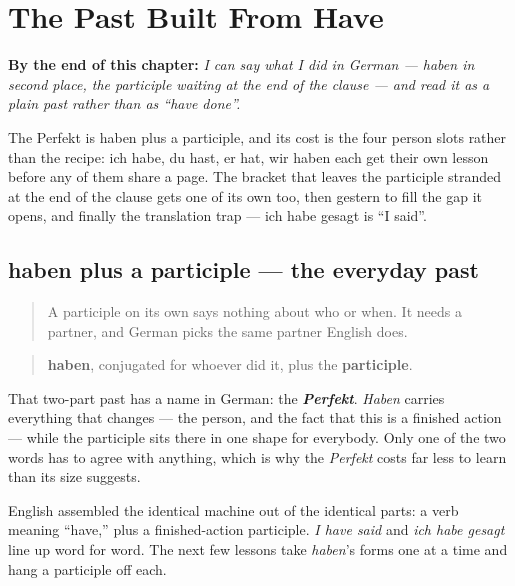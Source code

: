 
\chapter{The Past Built From Have}
\label{ch:perfekt}

\begin{chapteropening}
\textbf{By the end of this chapter:} \emph{I can say what I did in German — haben in second place, the participle waiting at the end of the clause — and read it as a plain past rather than as “have done”.}

The Perfekt is haben plus a participle, and its cost is the four person slots rather than the recipe: ich habe, du hast, er hat, wir haben each get their own lesson before any of them share a page. The bracket that leaves the participle stranded at the end of the clause gets one of its own too, then gestern to fill the gap it opens, and finally the translation trap — ich habe gesagt is “I said”.
\end{chapteropening}

\section[haben plus Partizip]{haben plus a participle — the everyday past}

\label{lesson:GE-C15-perfekt}



\begin{quote}
A participle on its own says nothing about who or when. It needs a partner, and German picks the same partner English does.
\end{quote}

\begin{grammarlens}[title={Grammar Lens: the recipe}]
\begin{quote}
\textbf{haben}, conjugated for whoever did it, plus the \textbf{participle}.
\end{quote}

That two-part past has a name in German: the \emph{\textbf{Perfekt}}. \emph{Haben} carries everything that changes — the person, and the fact that this is a finished action — while the participle sits there in one shape for everybody. Only one of the two words has to agree with anything, which is why the \emph{Perfekt} costs far less to learn than its size suggests.

English assembled the identical machine out of the identical parts: a verb meaning \textquotedblleft{}have,\textquotedblright{} plus a finished-action participle. \emph{I have said} and \emph{ich habe gesagt} line up word for word. The next few lessons take \emph{haben}'s forms one at a time and hang a participle off each.
\end{grammarlens}

